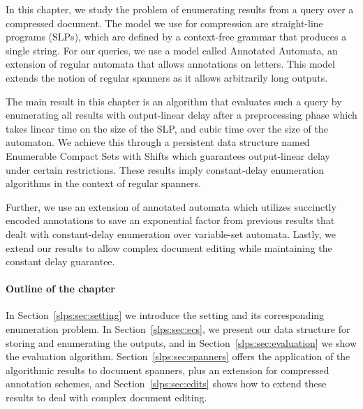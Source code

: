 
In this chapter, we study the problem of enumerating results from a query over a compressed document. The model we use for compression are straight-line programs (SLPs), which are defined by a context-free grammar that produces a single string. For our queries, we use a model called Annotated Automata, an extension of regular automata that allows annotations on letters. This model extends the notion of regular spanners as it allows arbitrarily long outputs. 

The main result in this chapter is an algorithm that evaluates such a query by enumerating all results with output-linear delay after a preprocessing phase which takes linear time on the size of the SLP, and cubic time over the size of the automaton. We achieve this through a persistent data structure named Enumerable Compact Sets with Shifts which guarantees output-linear delay under certain restrictions.
These results imply constant-delay enumeration algorithms in the context of regular spanners. 

Further, we use an extension of annotated automata which utilizes succinctly encoded annotations to save an exponential factor from previous results that dealt with constant-delay enumeration over variable-set automata.
Lastly, we extend our results to allow complex document editing while maintaining the constant delay guarantee.


\paragraph{Outline of the chapter} 
In Section~\ref{slps:sec:setting} we introduce the setting and its corresponding enumeration problem. 
In Section~\ref{slps:sec:ecs}, we present our data structure for storing and enumerating the outputs, and in Section~\ref{slps:sec:evaluation} we show the evaluation algorithm. 
Section~\ref{slps:sec:spanners} offers the application of the algorithmic results to document spanners, plus an extension for compressed annotation schemes, and Section~\ref{slps:sec:edits} shows how to extend these results to deal with complex document editing. 
